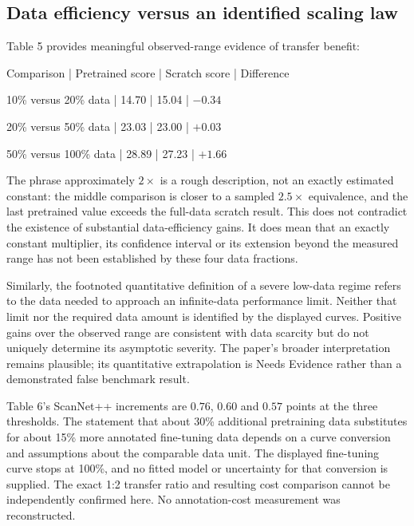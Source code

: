 \documentclass[10pt]{article}
\begin{document}
\subsection*{Data efficiency versus an identified scaling law}
Table 5 provides meaningful observed-range evidence of transfer benefit:\par
Comparison | Pretrained score | Scratch score | Difference\par
10\% versus 20\% data | 14.70 | 15.04 | \(-0.34\)\par
20\% versus 50\% data | 23.03 | 23.00 | \(+0.03\)\par
50\% versus 100\% data | 28.89 | 27.23 | \(+1.66\)\par
The phrase approximately \(2\times\) is a rough description, not an exactly estimated constant: the middle comparison is closer to a sampled \(2.5\times\) equivalence, and the last pretrained value exceeds the full-data scratch result. This does not contradict the existence of substantial data-efficiency gains. It does mean that an exactly constant multiplier, its confidence interval or its extension beyond the measured range has not been established by these four data fractions.\par
Similarly, the footnoted quantitative definition of a severe low-data regime refers to the data needed to approach an infinite-data performance limit. Neither that limit nor the required data amount is identified by the displayed curves. Positive gains over the observed range are consistent with data scarcity but do not uniquely determine its asymptotic severity. The paper’s broader interpretation remains plausible; its quantitative extrapolation is Needs Evidence rather than a demonstrated false benchmark result.\par
Table 6’s ScanNet++ increments are \(0.76\), \(0.60\) and \(0.57\) points at the three thresholds. The statement that about 30\% additional pretraining data substitutes for about 15\% more annotated fine-tuning data depends on a curve conversion and assumptions about the comparable data unit. The displayed fine-tuning curve stops at 100\%, and no fitted model or uncertainty for that conversion is supplied. The exact 1:2 transfer ratio and resulting cost comparison cannot be independently confirmed here. No annotation-cost measurement was reconstructed.\par
\end{document}
